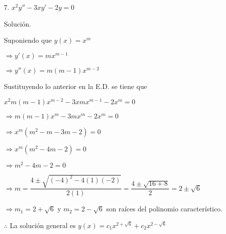 \documentclass[fleqn]{article}
\begin{document}
    7. $ x^2y'' - 3xy' - 2y = 0 $

    Solución.

    Suponiendo que $ y(x) = x^m $

    \hspace{18mm} $ \Longrightarrow y'(x) = mx^{m-1} $

    \hspace{18mm} $ \Longrightarrow y''(x) = m(m-1)x^{m-2} $

    Sustituyendo lo anterior en la E.D. se tiene que

    $ x^2m(m-1)x^{m-2} - 3xmx^{m-1} - 2x^m = 0 $

    $ \Longrightarrow m(m-1)x^m - 3mx^m - 2x^m = 0 $

    $ \Longrightarrow x^m(m^2 - m - 3m - 2) = 0 $

    $ \Longrightarrow x^m(m^2 - 4m - 2) = 0 $

    $ \Longrightarrow m^2 - 4m - 2 = 0 $

    $ \Longrightarrow m = \dfrac{4 \pm \sqrt{(-4)^2 - 4(1)(-2)}}{2(1)} = \dfrac{4 \pm \sqrt{16 + 8}}{2} = 2 \pm \sqrt{6} $

    $ \Longrightarrow m_1 = 2 + \sqrt{6} $ y $ m_2 = 2 - \sqrt{6} $ son raíces del polinomio característico.

    $ \therefore $ La solución general es $ y(x) = c_1x^{2 + \sqrt{6}} + c_2x^{2 - \sqrt{6}} $
\end{document}
